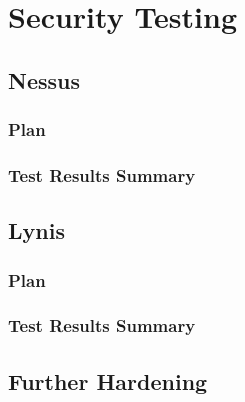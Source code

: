\section{Security Testing}
\subsection{Nessus}
\subsubsection{Plan}
\subsubsection{Test Results Summary}
\subsection{Lynis}
\subsubsection{Plan}
\subsubsection{Test Results Summary}


\subsection{Further Hardening}
